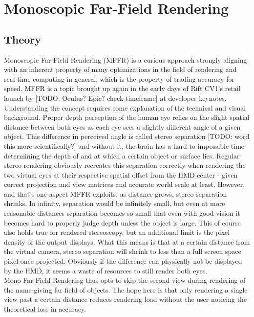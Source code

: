 
\section{Monoscopic Far-Field Rendering}
\subsection{Theory}
Monoscopic Far-Field Rendering (MFFR) is a curious approach strongly aligning with an inherent property of many optimizations in the field of rendering and real-time computing in general, which is the property of trading accuracy for speed. MFFR is a topic brought up again in the early days of Rift CV1's retail launch by [TODO: Oculus? Epic? check timeframe] at developer keynotes. \\
Understanding the concept requires some explanation of the technical and visual background. Proper depth perception of the human eye relies on the slight spatial distance between both eyes as each eye sees a slightly different angle of a given object. This difference in perceived angle is called stereo separation [TODO: word this more scientifically?] and without it, the brain has a hard to impossible time determining the depth of and at which a certain object or surface lies. Regular stereo rendering obviously recreates this separation correctly when rendering the two virtual eyes at their respective spatial offset from the HMD center - given correct projection and view matrices and accurate world scale at least. 
However, and that's one aspect MFFR exploits, as distance grows, stereo separation shrinks. In infinity, separation would be infinitely small, but even at more reasonable distances separation becomes so small that even with good vision it becomes hard to properly judge depth unless the object is large. This of course also holds true for rendered stereoscopy, but an additional limit is the pixel density of the output displays. What this means is that at a certain distance from the virtual camera, stereo separation will shrink to less than a full screen space pixel once projected. Obviously if the difference can physically not be displayed by the HMD, it seems a waste of resources to still render both eyes. \\
Mono Far-Field Rendering thus opts to skip the second view during rendering of the name-giving far field of objects. The hope here is that only rendering a single view past a certain distance reduces rendering load without the user noticing the theoretical loss in accuracy. 
